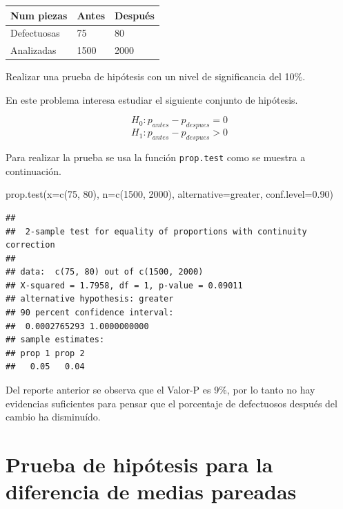 \documentclass[
]{book}
\makeatletter
\newenvironment{Shaded}{\begin{snugshade}}{\end{snugshade}}
\newcommand{\AttributeTok}[1]{\textcolor[rgb]{0.77,0.63,0.00}{#1}}
\newcommand{\DecValTok}[1]{\textcolor[rgb]{0.00,0.00,0.81}{#1}}
\newcommand{\FloatTok}[1]{\textcolor[rgb]{0.00,0.00,0.81}{#1}}
\newcommand{\FunctionTok}[1]{\textcolor[rgb]{0.00,0.00,0.00}{#1}}
\newcommand{\NormalTok}[1]{#1}
\newcommand{\StringTok}[1]{\textcolor[rgb]{0.31,0.60,0.02}{#1}}
\newenvironment{kframe}{%
\medskip{}
\setlength{\fboxsep}{.8em}
 \def\at@end@of@kframe{}%
 \ifinner\ifhmode%
  \def\at@end@of@kframe{\end{minipage}}%
  \begin{minipage}{\columnwidth}%
 \fi\fi%
 \def\FrameCommand##1{\hskip\@totalleftmargin \hskip-\fboxsep
 \colorbox{shadecolor}{##1}\hskip-\fboxsep
     \hskip-\linewidth \hskip-\@totalleftmargin \hskip\columnwidth}%
 \MakeFramed {\advance\hsize-\width
   \@totalleftmargin\z@ \linewidth\hsize
   \@setminipage}}%
 {\par\unskip\endMakeFramed%
 \at@end@of@kframe}
\renewenvironment{Shaded}{\begin{kframe}}{\end{kframe}}
\makeatother
\begin{document}
\begin{longtable}[]{@{}lll@{}}
\toprule
Num piezas & Antes & Después \\
\midrule
\endhead
Defectuosas & 75 & 80 \\
Analizadas & 1500 & 2000 \\
\bottomrule
\end{longtable}

Realizar una prueba de hipótesis con un nivel de significancia del 10\%.

En este problema interesa estudiar el siguiente conjunto de hipótesis.

\[H_0: p_{antes}  - p_{despues} = 0\]
\[H_1: p_{antes}  - p_{despues} > 0\]

Para realizar la prueba se usa la función \texttt{prop.test} como se muestra a continuación.

\begin{Shaded}
\begin{Highlighting}[]
\FunctionTok{prop.test}\NormalTok{(}\AttributeTok{x=}\FunctionTok{c}\NormalTok{(}\DecValTok{75}\NormalTok{, }\DecValTok{80}\NormalTok{), }\AttributeTok{n=}\FunctionTok{c}\NormalTok{(}\DecValTok{1500}\NormalTok{, }\DecValTok{2000}\NormalTok{),}
          \AttributeTok{alternative=}\StringTok{\textquotesingle{}greater\textquotesingle{}}\NormalTok{, }\AttributeTok{conf.level=}\FloatTok{0.90}\NormalTok{)}
\end{Highlighting}
\end{Shaded}

\begin{verbatim}
## 
##  2-sample test for equality of proportions with continuity correction
## 
## data:  c(75, 80) out of c(1500, 2000)
## X-squared = 1.7958, df = 1, p-value = 0.09011
## alternative hypothesis: greater
## 90 percent confidence interval:
##  0.0002765293 1.0000000000
## sample estimates:
## prop 1 prop 2 
##   0.05   0.04
\end{verbatim}

Del reporte anterior se observa que el Valor-P es 9\%, por lo tanto no hay evidencias suficientes para pensar que el porcentaje de defectuosos después del cambio ha disminuído.

\hypertarget{prueba-de-hipuxf3tesis-para-la-diferencia-de-medias-pareadas}{%
\section{Prueba de hipótesis para la diferencia de medias pareadas}\label{prueba-de-hipuxf3tesis-para-la-diferencia-de-medias-pareadas}}
\end{document}
